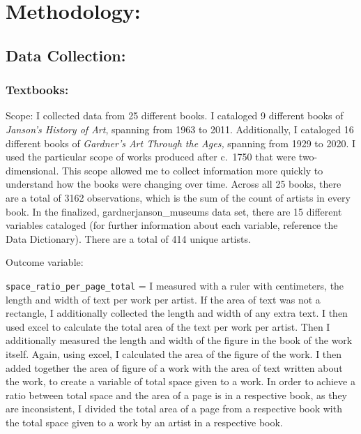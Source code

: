 \documentclass[
  letterpaper,
  DIV=11,
  numbers=noendperiod]{scrreprt}
\begin{document}
\hypertarget{methodology}{%
\chapter{\texorpdfstring{\textbf{Methodology:}}{Methodology:}}\label{methodology}}

\hypertarget{data-collection}{%
\section{Data Collection:}\label{data-collection}}

\hypertarget{textbooks}{%
\subsection{Textbooks:}\label{textbooks}}

Scope: I collected data from 25 different books. I cataloged 9 different
books of \emph{Janson's History of Art}, spanning from 1963 to 2011.
Additionally, I cataloged 16 different books of \emph{Gardner's Art
Through the Ages,} spanning from 1929 to 2020. I used the particular
scope of works produced after c.~1750 that were two-dimensional. This
scope allowed me to collect information more quickly to understand how
the books were changing over time. Across all 25 books, there are a
total of 3162 observations, which is the sum of the count of artists in
every book. In the finalized, gardnerjanson\_museums data set, there are
15 different variables cataloged (for further information about each
variable, reference the Data Dictionary). There are a total of 414
unique artists.

Outcome variable:

\texttt{space\_ratio\_per\_page\_total} = I measured with a ruler with
centimeters, the length and width of text per work per artist. If the
area of text was not a rectangle, I additionally collected the length
and width of any extra text. I then used excel to calculate the total
area of the text per work per artist. Then I additionally measured the
length and width of the figure in the book of the work itself. Again,
using excel, I calculated the area of the figure of the work. I then
added together the area of figure of a work with the area of text
written about the work, to create a variable of total space given to a
work. In order to achieve a ratio between total space and the area of a
page is in a respective book, as they are inconsistent, I divided the
total area of a page from a respective book with the total space given
to a work by an artist in a respective book.
\end{document}
